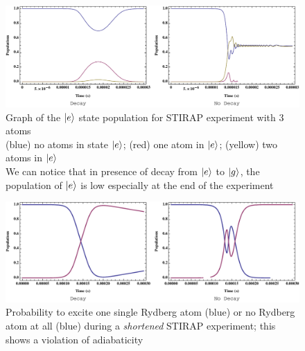 \documentclass[twoside, open=right
]{scrreprt}
\newcommand{\ff}{\ensuremath{\ket{g}}\xspace}
\newcommand{\ee}{\ensuremath{\ket{e}}\xspace}
\begin{document}
\begin{figure}[h]
  \centering
  \includegraphics[width=1\textwidth]{STIRAP-state-e.pdf}
  \caption{\label{STIRAP-state-e} Graph of the \ee state population for STIRAP experiment with 3 atoms \\
(blue) no atoms in state \ee; (red) one atom in \ee; (yellow) two atoms in \ee \\
We can notice that in presence of decay from \ee to \ff, the population of \ee is low especially at the end of the experiment}
\end{figure}

\begin{figure}[h]
  \centering
  \includegraphics[width=1\textwidth]{STIRAP-adiab.pdf}
  \caption{\label{STIRAP-adiab} Probability to excite one single Rydberg atom (blue) or no Rydberg atom at all (blue) during a \emph{shortened} STIRAP experiment; this shows a violation of adiabaticity}
\end{figure}
\end{document}
